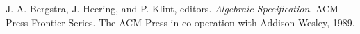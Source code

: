 \documentclass[a4paper,11pt]{article}
\begin{document}
\begin{thebibliography}{99}

J. A. Bergstra, J. Heering, and P. Klint, editors. \emph{Algebraic
Specification}. ACM Press Frontier Series. The ACM Press in co-operation with Addison-Wesley,
1989.












\end{thebibliography}
\end{document}
